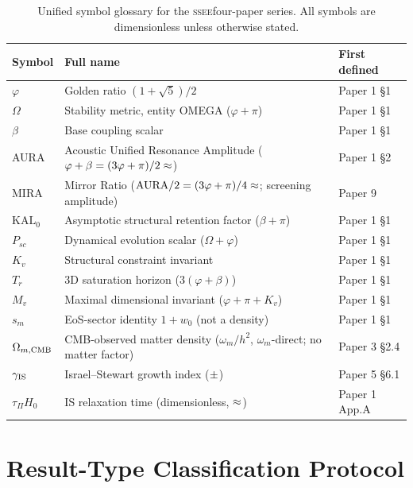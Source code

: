 \documentclass[12pt,a4paper]{article}
\newcommand{\SSEE}{\ifmmode\mathrm{SSEE}\else\textsc{ssee}\fi}
\begin{document}
\begin{table}[H]
\centering
\caption{Unified symbol glossary for the \SSEE four-paper series.
  All symbols are dimensionless unless otherwise stated.}
\label{tab:notation}
\footnotesize
\begin{tabularx}{\textwidth}{p{2.2cm}Xp{2.8cm}}
\toprule
Symbol & Full name & First defined \\
\midrule
$\varphi$ & Golden ratio $(1+\sqrt{5})/2$ & Paper 1 §1 \\
$\Omega$ & Stability metric, entity OMEGA ($\varphi+\pi$) & Paper 1 §1 \\
$\beta$ & Base coupling scalar & Paper 1 §1 \\
AURA & Acoustic Unified Resonance Amplitude ($\varphi+\beta=(3\varphi+\pi)/2\approx\val{AURA_d3}$) & Paper 1 §2 \\
MIRA & Mirror Ratio ($\mathrm{AURA}/2=(3\varphi+\pi)/4\approx\val{MIRA_d4}$; screening amplitude) & Paper 9 \\
$\mathrm{KAL}_0$ & Asymptotic structural retention factor ($\beta+\pi$) & Paper 1 §1 \\
$P_{sc}$ & Dynamical evolution scalar ($\Omega+\varphi$) & Paper 1 §1 \\
$K_v$ & Structural constraint invariant & Paper 1 §1 \\
$T_r$ & 3D saturation horizon ($3(\varphi+\beta)$) & Paper 1 §1 \\
$M_v$ & Maximal dimensional invariant ($\varphi+\pi+K_v$) & Paper 1 §1 \\
$s_m$ & EoS-sector identity $1+w_0$ (not a density) & Paper 1 §1 \\
$\Omega_{m,\rm CMB}$ & CMB-observed matter density ($\omega_m/h^2$, $\omega_m$-direct; no matter factor) & Paper 3 §2.4 \\
$\gamma_{\rm IS}$ & Israel--Stewart growth index ($\val{p3_gamma_IS}\pm\val{p3_gamma_IS_sigma}$) & Paper 5 §6.1 \\
$\tau_\Pi H_0$ & IS relaxation time (dimensionless, $\approx\val{TAU_PI_H0_d3}$) & Paper 1 App.A \\
\bottomrule
\end{tabularx}
\end{table}

\section{Result-Type Classification Protocol}
\label{app:result_types}
\end{document}
